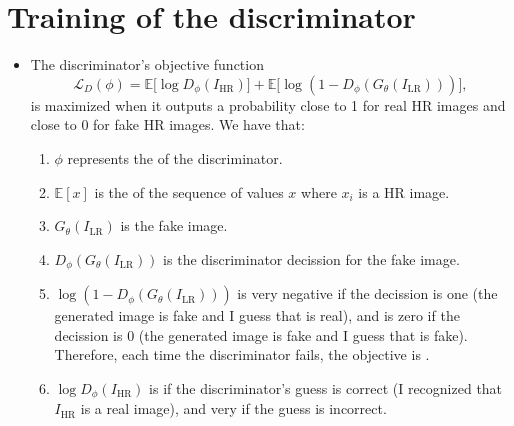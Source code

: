 \section*{Training of the discriminator}
\begin{itemize}
\item The discriminator’s objective function
\begin{equation}
  \mathcal{L}_D(\phi) = 
  \mathbb{E}\big[ \log D_\phi(I_{\text{HR}}) \big] 
  + \mathbb{E}\big[ \log (1 - D_\phi(G_\theta(I_{\text{LR}}))) \big],
\end{equation}
is maximized when it outputs a probability close to 1 for real HR
images and close to 0 for fake HR images. We have that:
\begin{enumerate}
\item $\phi$ represents the  of
  the discriminator.
\item $\mathbb{E}[x]$ is the
   of the sequence of values
  $x$ where $x_i$ is a HR image.
\item $G_\theta(I_{\text{LR}})$ is the fake image.
\item $ D_\phi(G_\theta(I_{\text{LR}}))$ is the discriminator decission for the fake image.
\item $\log(1 - D_\phi(G_\theta(I_{\text{LR}})))$ is very negative if
  the decission is one (the generated image is fake and I guess that
  is real), and is zero if the decission is 0 (the generated image is
  fake and I guess that is fake). Therefore, each time the
  discriminator fails, the objective is .
\item $\log D_\phi(I_{\text{HR}})$ is  if the
  discriminator's guess is correct (I recognized that $I_{\text{HR}}$
  is a real image), and very  if the guess is
  incorrect.
\end{enumerate}
\end{itemize}

